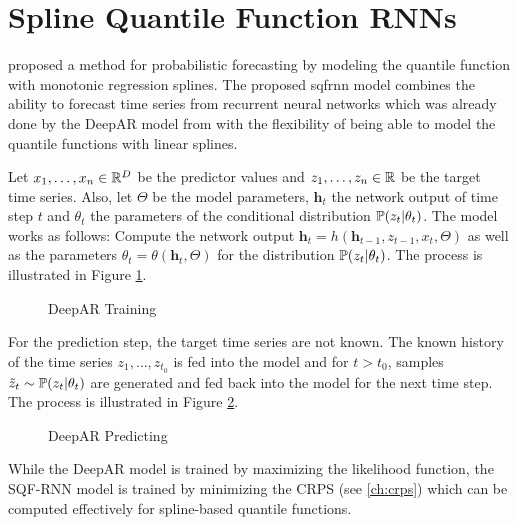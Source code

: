 \section{Spline Quantile Function RNNs}
\label{sec:sqf-rnn}

\Textcite{Gasthaus2019} proposed a method for probabilistic forecasting by modeling 
the quantile function with monotonic regression splines. 
The proposed \gls{sqfrnn} model combines the ability to forecast time series 
from recurrent neural networks which was already done by the DeepAR model from \Textcite{Salinas2017}
with the flexibility of being able to 
model the quantile functions with linear splines. 

Let \(x_1, \ldots, x_n \in \R^D\) be the predictor values and 
\(z_1, \ldots, z_n \in \R\) be the target time series. Also, let \(\Theta\) 
be the model parameters, \(\boldsymbol{h}_t\) the network output of 
time step \(t\) and \(\theta_t\) the parameters of the conditional distribution \(\P(z_t | \theta_t)\).
The model works as follows:
Compute the network output \(\boldsymbol{h}_t = h(\boldsymbol{h}_{t-1}, z_{t-1}, x_t, \Theta)\) 
as well as the parameters \(\theta_t = \theta(\boldsymbol{h}_t, \Theta)\) for the distribution
\(\P(z_t | \theta_t)\). The process is illustrated in Figure \ref{fig:deepar-training}.

\begin{figure}[h]%
    \centering
    
    \caption{DeepAR Training}%
    \label{fig:deepar-training}%
\end{figure}

For the prediction step, the target time series are not known. 
The known history of the time series \(z_1, \ldots, z_{t_0}\) is fed into the 
model and for \(t > t_0\), samples \(\tilde{z}_t \sim \P(z_t | \theta_t)\) 
are generated and fed back into the model for the next time step.
The process is illustrated in Figure \ref{fig:deepar-predicting}.

\begin{figure}[h]%
    \centering
    
    \caption{DeepAR Predicting}%
    \label{fig:deepar-predicting}%
\end{figure}

While the DeepAR model is trained by maximizing the likelihood function, 
the SQF-RNN model is trained by minimizing the CRPS (see \ref{ch:crps}) 
which can be computed effectively for spline-based quantile functions.

